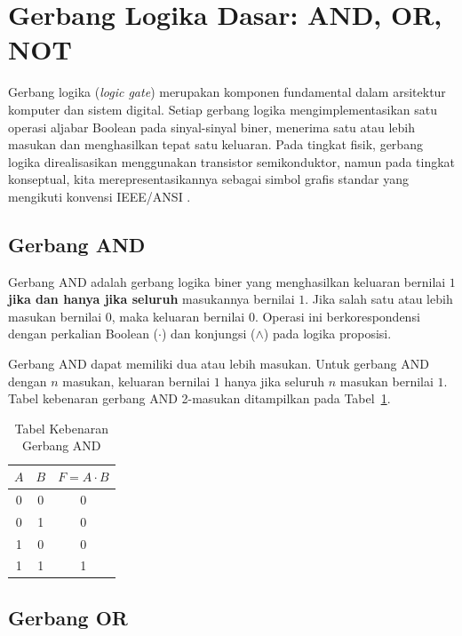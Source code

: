 \section{Gerbang Logika Dasar: AND, OR, NOT}

Gerbang logika (\textit{logic gate}) merupakan komponen fundamental dalam arsitektur komputer dan sistem digital. Setiap gerbang logika mengimplementasikan satu operasi aljabar Boolean pada sinyal-sinyal biner, menerima satu atau lebih masukan dan menghasilkan tepat satu keluaran. Pada tingkat fisik, gerbang logika direalisasikan menggunakan transistor semikonduktor, namun pada tingkat konseptual, kita merepresentasikannya sebagai simbol grafis standar yang mengikuti konvensi IEEE/ANSI \cite{allaboutcircuits_gates}.

\subsection{Gerbang AND}

\begin{definisi}
Gerbang AND adalah gerbang logika biner yang menghasilkan keluaran bernilai $1$ \textbf{jika dan hanya jika seluruh} masukannya bernilai $1$. Jika salah satu atau lebih masukan bernilai $0$, maka keluaran bernilai $0$. Operasi ini berkorespondensi dengan perkalian Boolean ($\cdot$) dan konjungsi ($\wedge$) pada logika proposisi.
\end{definisi}

Gerbang AND dapat memiliki dua atau lebih masukan. Untuk gerbang AND dengan $n$ masukan, keluaran bernilai $1$ hanya jika seluruh $n$ masukan bernilai $1$. Tabel kebenaran gerbang AND 2-masukan ditampilkan pada Tabel~\ref{tab:and-gate}.

\begin{table}[htbp]
\centering
\renewcommand{\arraystretch}{1.3}
\begin{tabular}{|c|c||c|}
\hline
$A$ & $B$ & $F = A \cdot B$ \\ \hline
0 & 0 & 0 \\ \hline
0 & 1 & 0 \\ \hline
1 & 0 & 0 \\ \hline
1 & 1 & 1 \\ \hline
\end{tabular}
\caption{Tabel Kebenaran Gerbang AND}
\label{tab:and-gate}
\end{table}

\subsection{Gerbang OR}

